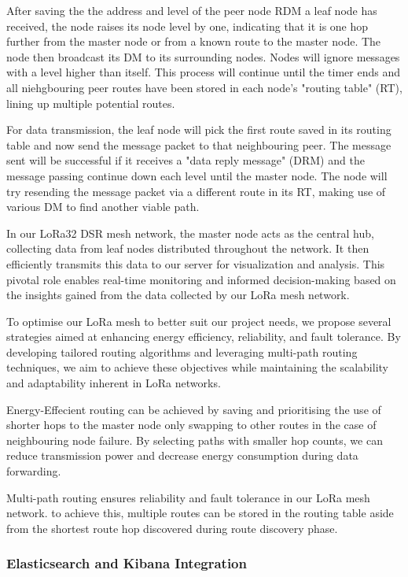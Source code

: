 After saving the the address and level of the peer node RDM a leaf node has received, the node raises its node level by one, indicating that it is one hop further from the master node or from a known route to the master node. The node then broadcast its DM to its surrounding nodes. Nodes will ignore messages with a level higher than itself. This process will continue until the timer ends and all niehgbouring peer routes have been stored in each node's "routing table" (RT), lining up multiple potential routes.

For data transmission, the leaf node will pick the first route saved in its routing table and now send the message packet to that neighbouring peer. The message sent will be successful if it receives a "data reply message" (DRM) and the message passing continue down each level until the master node. The node will try resending the message packet via a different route in its RT, making use of various DM to find another viable path.

In our LoRa32 DSR mesh network, the master node acts as the central hub, collecting data from leaf nodes distributed throughout the network. It then efficiently transmits this data to our server for visualization and analysis. This pivotal role enables real-time monitoring and informed decision-making based on the insights gained from the data collected by our LoRa mesh network.

To optimise our LoRa mesh to better suit our project needs, we propose several strategies aimed at enhancing energy efficiency, reliability, and fault tolerance. By developing tailored routing algorithms and leveraging multi-path routing techniques, we aim to achieve these objectives while maintaining the scalability and adaptability inherent in LoRa networks.

Energy-Effecient routing can be achieved by saving and prioritising the use of shorter hops to the master node only swapping to other routes in the case of neighbouring node failure. By selecting paths with smaller hop counts, we can reduce transmission power and decrease energy consumption during data forwarding.

Multi-path routing ensures reliability and fault tolerance in our LoRa mesh network. to achieve this, multiple routes can be stored in the routing table aside from the shortest route hop discovered during route discovery phase.

\subsubsection{Elasticsearch and Kibana Integration}

